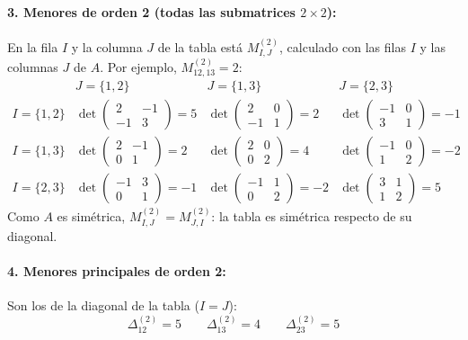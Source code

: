 \documentclass{article}
\begin{document}
\paragraph*{3. Menores de orden 2 (todas las submatrices \(2\times2\)):}
En la fila \(I\) y la columna \(J\) de la tabla está \(M^{(2)}_{I,J}\), calculado con las filas \(I\) y las columnas \(J\) de \(A\). Por ejemplo, \(M^{(2)}_{12,13}=2\):
\[
\begin{array}{c|ccc}
 & J=\{1,2\} & J=\{1,3\} & J=\{2,3\}\\ \hline
I=\{1,2\} & \det\begin{pmatrix}2&-1\\-1&3\end{pmatrix}=5
 & \det\begin{pmatrix}2&0\\-1&1\end{pmatrix}=2
 & \det\begin{pmatrix}-1&0\\3&1\end{pmatrix}=-1\\[10pt]
I=\{1,3\} & \det\begin{pmatrix}2&-1\\0&1\end{pmatrix}=2
 & \det\begin{pmatrix}2&0\\0&2\end{pmatrix}=4
 & \det\begin{pmatrix}-1&0\\1&2\end{pmatrix}=-2\\[10pt]
I=\{2,3\} & \det\begin{pmatrix}-1&3\\0&1\end{pmatrix}=-1
 & \det\begin{pmatrix}-1&1\\0&2\end{pmatrix}=-2
 & \det\begin{pmatrix}3&1\\1&2\end{pmatrix}=5
\end{array}
\]
Como \(A\) es simétrica, \(M^{(2)}_{I,J}=M^{(2)}_{J,I}\): la tabla es simétrica respecto de su diagonal.

\paragraph*{4. Menores principales de orden 2:}
Son los de la diagonal de la tabla (\(I=J\)):
\[
\Delta^{(2)}_{12}=5\qquad\Delta^{(2)}_{13}=4\qquad\Delta^{(2)}_{23}=5
\]
\end{document}
